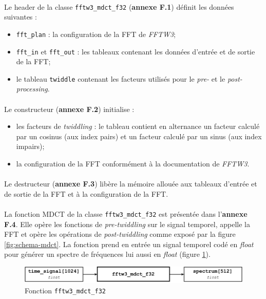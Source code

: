 \documentclass{article}
\begin{document}
    \paragraph{}
    Le header de la classe \texttt{fftw3\_mdct\_f32} (\textbf{annexe F.1}) définit les données suivantes :
    \begin{itemize}
        \item \texttt{fft\_plan} : la configuration de la FFT de \emph{FFTW3};
        \item \texttt{fft\_in} et \texttt{fft\_out} : les tableaux contenant les données d'entrée et de sortie de la FFT;
        \item le tableau \texttt{twiddle} contenant les facteurs utilisés pour le \emph{pre-} et le \emph{post-processing}.
    \end{itemize}

    \paragraph{}
    Le constructeur (\textbf{annexe F.2}) initialise :
    \begin{itemize}
        \item les facteurs de \emph{twiddling} : le tableau contient en alternance un facteur calculé par un cosinus (aux index pairs) et un facteur calculé par un sinus (aux index impairs);
        \item la configuration de la FFT conformément à la documentation de \emph{FFTW3}.
    \end{itemize}

    \paragraph{}
    Le destructeur (\textbf{annexe F.3}) libère la mémoire allouée aux tableaux d'entrée et de sortie de la FFT et à la configuration de la FFT.

    \paragraph{}
    La fonction MDCT de la classe \texttt{fftw3\_mdct\_f32} est présentée dans l'\textbf{annexe F.4}. Elle opère les fonctions de \emph{pre-twiddling} sur le signal temporel, appelle la FFT et opère les opérations de \emph{post-twiddling} comme exposé par la figure \ref{fig:schema-mdct}. La fonction prend en entrée un signal temporel codé en \emph{float} pour générer un spectre de fréquences lui aussi en \emph{float} (figure \ref{fig:func_fftw3_mdct_f32}).
    \begin{figure}[H]
        \centering
        \includegraphics[width=.8\linewidth]{./images/func_fftw3_mdct_f32.pdf}
        \caption{Fonction \texttt{fftw3\_mdct\_f32}}
        \label{fig:func_fftw3_mdct_f32}
    \end{figure}
\end{document}
